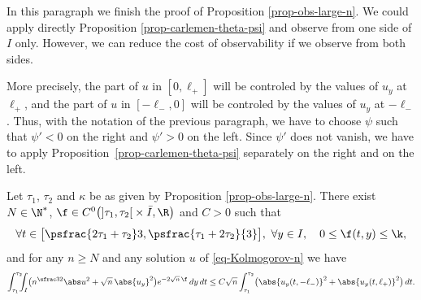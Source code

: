 In this paragraph we finish the proof of Proposition \ref{prop-obs-large-n}.
We could apply directly Proposition \ref{prop-carlemen-theta-psi} and observe from one side of $I$ only. However, we can reduce the cost of observability if we observe from both sides.

More precisely, the part of $u$ in $[0,\ell_+]$ will be controled by the values of $u_y$ at $\ell_+$, and the part of $u$ in $[-\ell_-,0]$ will be controled by the values of $u_y$ at $-\ell_-$. Thus, with the notation of the previous paragraph, we have to choose $\psi$ such that $\psi' < 0$ on the right and $\psi' > 0$ on the left. Since $\psi'$ does not vanish, we have to apply Proposition~\ref{prop-carlemen-theta-psi} separately on the right and on the left.

\begin{proposition} \label{prop-def-phi}
Let $\tau_1$, $\tau_2$ and $\kappa$ be as given by Proposition \ref{prop-obs-large-n}. There exist $N \in \N^*$, $\f \in C^0 \bigl(]\tau_1,\tau_2[{}\times \bar I,\R \bigr)$ and $C > 0$ such that
\begin{equation} \label{eq-phi}
\forall t \in \bigl[ \psfrac {2\tau_1 + \tau_2} 3 , \psfrac {\tau_1 + 2 \tau_2}{3} \bigr],\ \forall y \in I, \quad 0 \leq \f(t,y) \leq \k,
\end{equation}
and for any $n \geq N$ and any solution $u$ of \eqref{eq-Kolmogorov-n} we have
\[
\int_{\tau_1}^{\tau_2}\hspace*{-2mm} \int_{I} \bigl(n^{\sfrac 32} \abs u^2 + \sqrt n\,\abs{u_y}^2 \bigr) e^{-2\sqrt n\,\f} \, dy \, dt \leq C \sqrt n \int_{\tau_1}^{\tau_2} \bigl(\abs{u_y(t,-\ell_-)}^2 + \abs{u_y(t,\ell_+)}^2\bigr) \, dt.
\]
\end{proposition}

